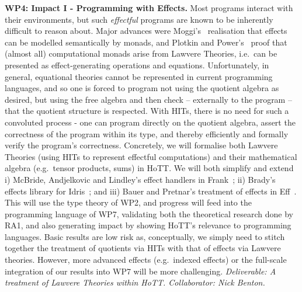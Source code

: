 \documentclass[a4paper,11pt]{article}
\newcommand{\eg}{{e.g.}\ }
\begin{document}
{\bf WP4: Impact I - Programming with Effects.}
Most programs interact with their environments,
but such \emph{effectful} programs are known to be inherently difficult to
reason about.
Major advances were Moggi's~\cite{moggi:monad} realisation that effects can be modelled semantically by monads, and
Plotkin and Power's~\cite{PlotkinPower:Lawvere} proof that (almost
all) computational monads arise from Lawvere Theories, i.e.\ can be
presented as effect-generating operations and equations.
Unfortunately, in general, equational theories cannot be represented
in current programming languages, and so one is 
forced to program not using the quotient algebra as desired, but using
the free algebra and then check -- externally to the program -- that
the quotient structure is respected.  With HITs, there is no need for
such a convoluted process - one can program directly on the quotient
algebra, assert the correctness of the program within its type, and
thereby efficiently and formally verify the program's
correctness. Concretely, we will formalise both Lawvere Theories
(using HITs to represent effectful computations) and their
mathematical algebra (e.g.\ tensor products, sums) in HoTT.  We will
both simplify and extend i) McBride, Andjelkovic and Lindley's effect
handlers in Frank~\cite{conor:frank}; ii) Brady's effects library for
Idris~\cite{brady:effects}; and iii) Bauer and Pretnar's treatment of
effects in Eff~\cite{bauer:eff}.  This will use the type 
theory of WP2, and progress will feed into the programming
language of WP7, validating both the theoretical research done by RA1,
and also generating impact by showing HoTT's relevance to
programming languages. Basic results are low risk as,
conceptually, we simply need to stitch together the treatment of
quotients via HITs with that of effects via Lawvere theories.
However, more advanced effects (\eg indexed effects) or the full-scale
integration of our results into WP7 will be more challenging. {\em
  Deliverable: A treatment of Lawvere Theories within
  HoTT. Collaborator: Nick Benton.}
\end{document}
